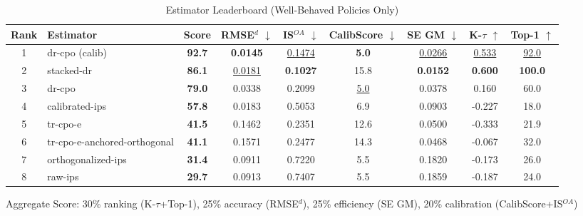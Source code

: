 \begin{table}[htbp]
\centering
\caption{Estimator Leaderboard (Well-Behaved Policies Only)}
\label{tab:leaderboard}
\begin{tabular}{cl|c|cccccc}
\toprule
Rank & Estimator & Score & RMSE$^d$ $\downarrow$ & IS$^{OA}$ $\downarrow$ & CalibScore $\downarrow$ & SE GM $\downarrow$ & K-$\tau$ $\uparrow$ & Top-1 $\uparrow$ \\
\midrule
1 & dr-cpo (calib) & \textbf{92.7} & \textbf{0.0145} & \underline{0.1474} & \textbf{5.0} & \underline{0.0266} & \underline{0.533} & \underline{92.0} \\
2 & stacked-dr & \textbf{86.1} & \underline{0.0181} & \textbf{0.1027} & 15.8 & \textbf{0.0152} & \textbf{0.600} & \textbf{100.0} \\
3 & dr-cpo & \textbf{79.0} & 0.0338 & 0.2099 & \underline{5.0} & 0.0378 & 0.160 & 60.0 \\
4 & calibrated-ips & \textbf{57.8} & 0.0183 & 0.5053 & 6.9 & 0.0903 & -0.227 & 18.0 \\
5 & tr-cpo-e & \textbf{41.5} & 0.1462 & 0.2351 & 12.6 & 0.0500 & -0.333 & 21.9 \\
6 & tr-cpo-e-anchored-orthogonal & \textbf{41.1} & 0.1571 & 0.2477 & 14.3 & 0.0468 & -0.067 & 32.0 \\
7 & orthogonalized-ips & \textbf{31.4} & 0.0911 & 0.7220 & 5.5 & 0.1820 & -0.173 & 26.0 \\
8 & raw-ips & \textbf{29.7} & 0.0913 & 0.7407 & 5.5 & 0.1859 & -0.187 & 24.0 \\
\bottomrule
\end{tabular}
\footnotesize{Aggregate Score: 30\% ranking (K-$\tau$+Top-1), 25\% accuracy (RMSE$^d$), 25\% efficiency (SE GM), 20\% calibration (CalibScore+IS$^{OA}$)}
\end{table}
